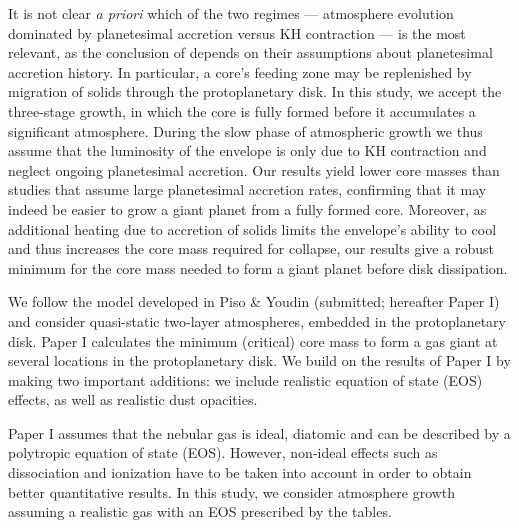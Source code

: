 \documentclass[apj]{emulateapj}
\begin{document}
It is not clear \textit{a priori} which of the two regimes --- atmosphere evolution dominated by planetesimal accretion versus KH contraction --- is the most relevant, as the conclusion of \citet{pollack96} depends on their assumptions about planetesimal accretion history. In particular, a core's feeding zone may be replenished by migration of solids through the protoplanetary disk. In this study, we accept the three-stage growth, in which the core is fully formed before it accumulates a significant atmosphere. During the slow phase of atmospheric growth we thus assume that the luminosity of the envelope is only due to KH contraction and neglect ongoing planetesimal accretion. Our results yield lower core masses than studies that assume large planetesimal accretion rates, confirming that it may indeed be easier to grow a giant planet from a fully formed core. Moreover, as additional heating due to accretion of solids limits the envelope's ability to cool and thus increases the core mass required for collapse, our results give a robust minimum for the core mass needed to form a giant planet before disk dissipation.


We follow the model developed in Piso \& Youdin (submitted; hereafter Paper I) and consider quasi-static two-layer atmospheres, embedded in the protoplanetary disk. Paper I calculates the minimum (critical) core mass to form a gas giant at several locations in the protoplanetary disk. We build on the results of Paper I by making two important additions: we include realistic equation of state (EOS) effects, as well as realistic dust opacities.


 Paper I assumes that the nebular gas is ideal, diatomic and can be described by a polytropic equation of state (EOS). However, non-ideal effects such as dissociation and ionization have to be taken into account in order to obtain better quantitative results. In this study, we consider atmosphere growth assuming a realistic gas with an EOS prescribed by the \citet{saumon95} tables. %
 
\end{document}
